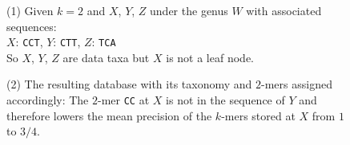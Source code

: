 \documentclass[pdflatex,sn-vancouver-num]{sn-jnl}
\begin{document}
\begin{figure}[!htbp]%
\centering
\small
\begin{minipage}[c]{0.25\textwidth}
\begin{flushleft}(1) Given $k = 2$ and $X$, $Y$, $Z$ under the genus $W$ with associated sequences:\\
$X$: \texttt{CCT}, $Y$: \texttt{CTT}, $Z$: \texttt{TCA}\\
So $X$, $Y$, $Z$ are data taxa but $X$ is not a leaf node.
\end{flushleft}
\end{minipage}
\begin{minipage}[c]{0.2\textwidth}
\end{minipage}
\begin{minipage}[c]{0.25\textwidth}
\begin{flushleft}(2) The resulting database with its taxonomy and $2$-mers assigned accordingly: The $2$-mer \texttt{CC} at $X$ is not in the sequence of $Y$ and therefore lowers the mean precision of the $k$-mers stored at $X$ from $1$ to $3/4$.
\end{flushleft}
\end{minipage}
\begin{minipage}[c]{0.2\textwidth}
\end{minipage}

\vspace{0.2cm}


\end{figure}
\end{document}
